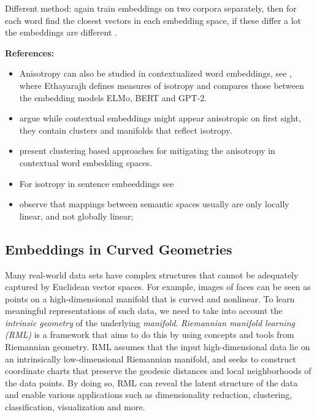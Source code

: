 \documentclass[11pt, a4paper]{amsart}
\begin{document}
Different method:
again train embeddings on two corpora separately, then for each word find the closest vectors in each embedding space, if these differ a lot the embeddings are different \cite{gonen-etal-2020-simple}.


\noindent \textbf{References:}
\begin{itemize}
	\item Anisotropy can also be studied in contextualized word embeddings, see \cite{ethayarajh-2019-contextual}, where Ethayarajh defines measures of isotropy and compares those between the embedding models ELMo, BERT and GPT-2.
	\item \cite{cai2021isotropy} argue while contextual embeddings might appear anisotropic on first sight, they contain clusters and manifolds that reflect isotropy.
	\item \cite{rajaee-pilehvar-2021-cluster} present clustering based approaches for mitigating the anisotropy in contextual word embedding spaces.
	\item For isotropy in sentence embeeddings see \cite{li-etal-2020-sentence}
	\item \cite{nakashole-flauger-2018-characterizing} observe that mappings between semantic spaces usually are only locally linear, and not globally linear;
\end{itemize}


\subsection{Embeddings in Curved Geometries}

Many real-world data sets have complex structures that cannot be adequately captured by Euclidean vector spaces.
For example, images of faces can be seen as points on a high-dimensional manifold that is curved and nonlinear.
To learn meaningful representations of such data, we need to take into account the \emph{intrinsic geometry} of the underlying \emph{manifold}.
\emph{Riemannian manifold learning (RML)} is a framework that aims to do this by using concepts and tools from Riemannian geometry.
RML assumes that the input high-dimensional data lie on an intrinsically low-dimensional Riemannian manifold, and seeks to construct coordinate charts that preserve the geodesic distances and local neighborhoods of the data points. 
By doing so, RML can reveal the latent structure of the data and enable various applications such as dimensionality reduction, clustering, classification, visualization and more.
\end{document}
